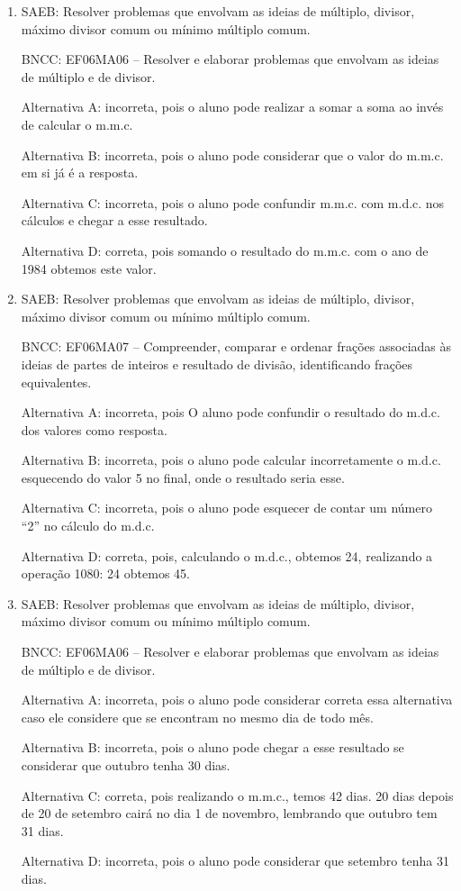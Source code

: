 	\begin{enumerate}

		\item SAEB: Resolver problemas que envolvam as ideias de múltiplo, divisor,
máximo divisor comum ou mínimo múltiplo comum.

BNCC: EF06MA06 -- Resolver e elaborar problemas que envolvam as ideias
de múltiplo e de divisor.

Alternativa A: incorreta, pois o aluno pode realizar a somar a soma ao
invés de calcular o m.m.c.

Alternativa B: incorreta, pois o aluno pode considerar que o valor do
m.m.c. em si já é a resposta.

Alternativa C: incorreta, pois o aluno pode confundir m.m.c. com m.d.c.
nos cálculos e chegar a esse resultado.

Alternativa D: correta, pois somando o resultado do m.m.c. com o ano de
1984 obtemos este valor.

		\item SAEB: Resolver problemas que envolvam as ideias de múltiplo, divisor,
máximo divisor comum ou mínimo múltiplo comum.

BNCC: EF06MA07 -- Compreender, comparar e ordenar frações associadas às
ideias de partes de inteiros e resultado de divisão, identificando
frações equivalentes.

Alternativa A: incorreta, pois O aluno pode confundir o resultado do
m.d.c. dos valores como resposta.

Alternativa B: incorreta, pois o aluno pode calcular incorretamente o
m.d.c. esquecendo do valor 5 no final, onde o resultado seria esse.

Alternativa C: incorreta, pois o aluno pode esquecer de contar um número
``2'' no cálculo do m.d.c.

Alternativa D: correta, pois, calculando o m.d.c., obtemos 24,
realizando a operação 1080: 24 obtemos 45.

		\item SAEB: Resolver problemas que envolvam as ideias de múltiplo, divisor,
máximo divisor comum ou mínimo múltiplo comum.

BNCC: EF06MA06 -- Resolver e elaborar problemas que envolvam as ideias
de múltiplo e de divisor.

Alternativa A: incorreta, pois o aluno pode considerar correta essa
alternativa caso ele considere que se encontram no mesmo dia de todo
mês.

Alternativa B: incorreta, pois o aluno pode chegar a esse resultado se
considerar que outubro tenha 30 dias.

Alternativa C: correta, pois realizando o m.m.c., temos 42 dias. 20 dias
depois de 20 de setembro cairá no dia 1 de novembro, lembrando que
outubro tem 31 dias.

Alternativa D: incorreta, pois o aluno pode considerar que setembro
tenha 31 dias.

	\end{enumerate}

